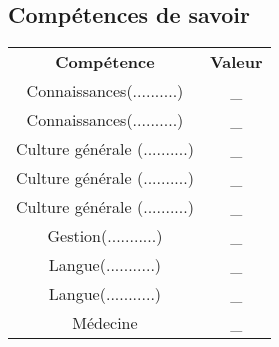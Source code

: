 \documentclass[10pt,a4paper]{article}
\begin{document}
\begin{multicols}{3}
  \subsection*{Compétences de savoir}
  \begin{tabular}{cc}
  \textbf{Compétence}& \textbf{Valeur}\\
  Connaissances(..........)& \_\\
  Connaissances(..........)& \_\\
  Culture générale (..........)& \_\\
  Culture générale (..........)& \_\\
  Culture générale (..........)& \_\\
  Gestion(...........)& \_\\
  Langue(...........)& \_\\
  Langue(...........)& \_\\
  Médecine& \_\\
  \end{tabular}
\end{multicols}
\newpage
\end{document}
